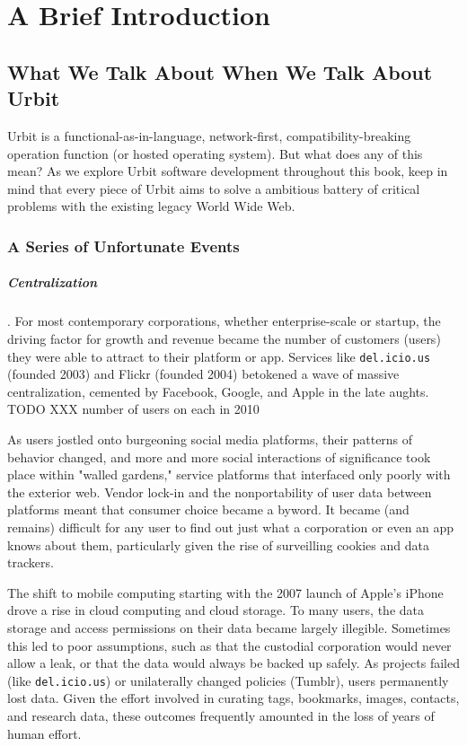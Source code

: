 \setchapterpreamble[u]{\margintoc}
\chapter{A Brief Introduction}


\section{What We Talk About When We Talk About Urbit}

Urbit is a functional-as-in-language, network-first, compatibility-breaking
operation function (or hosted operating system).  But what does any of this mean?  As we explore Urbit software development throughout this book, keep in mind that every piece of Urbit aims to solve a ambitious battery of critical problems with the existing legacy World Wide Web.

\subsection{A Series of Unfortunate Events}

\paragraph{Centralization}.  For most contemporary corporations, whether enterprise-scale or startup, the driving factor for growth and revenue became the number of customers (users) they were able to attract to their platform or app.  Services like \texttt{del.icio.us} (founded 2003) and Flickr (founded 2004) betokened a wave of massive centralization, cemented by Facebook, Google, and Apple in the late aughts.  TODO XXX number of users on each in 2010

As users jostled onto burgeoning social media platforms, their patterns of behavior changed, and more and more social interactions of significance took place within "walled gardens," service platforms that interfaced only poorly with the exterior web.  Vendor lock-in and the nonportability of user data between platforms meant that consumer choice became a byword.  It became (and remains) difficult for any user to find out just what a corporation or even an app knows about them, particularly given the rise of surveilling cookies and data trackers.

The shift to mobile computing starting with the 2007 launch of Apple's iPhone drove a rise in cloud computing and cloud storage.  To many users, the data storage and access permissions on their data became largely illegible.  Sometimes this led to poor assumptions, such as that the custodial corporation would never allow a leak, or that the data would always be backed up safely.  As projects failed (like \texttt{del.icio.us}) or unilaterally changed policies (Tumblr), users permanently lost data.  Given the effort involved in curating tags, bookmarks, images, contacts, and research data, these outcomes frequently amounted in the loss of years of human effort.

